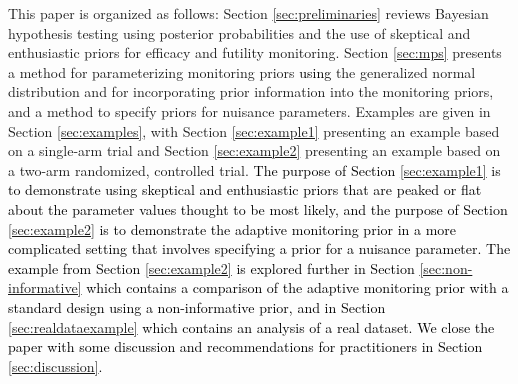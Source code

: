 \documentclass[12pt]{article}
\begin{document}
This paper is organized as follows: %
Section \ref{sec:preliminaries} reviews Bayesian hypothesis testing using posterior probabilities and the use of  skeptical and enthusiastic priors for efficacy and futility monitoring. 
%
Section \ref{sec:mps} presents a method for parameterizing monitoring priors \textcolor{black}{using} the generalized normal distribution and for incorporating prior information into the monitoring priors, and a method to specify priors for nuisance parameters.
%
Examples are given in Section \ref{sec:examples}, with Section \ref{sec:example1} presenting an example based on a single-arm trial and Section \ref{sec:example2} presenting an example based on a two-arm randomized, controlled trial. \textcolor{black}{The purpose of Section \ref{sec:example1} is to demonstrate using skeptical and enthusiastic priors that are peaked or flat about the parameter values thought to be most likely, and the purpose of Section \ref{sec:example2} is to demonstrate the adaptive monitoring prior in a more complicated setting that involves specifying a prior for a nuisance parameter.} \textcolor{black}{The example from Section \ref{sec:example2} is explored further in Section \ref{sec:non-informative} which contains a comparison of the adaptive monitoring prior with a standard design using a non-informative prior, and in Section \ref{sec:realdataexample} which contains an analysis of a real dataset. We close the paper with some discussion and recommendations for practitioners in Section \ref{sec:discussion}.}
\end{document}
